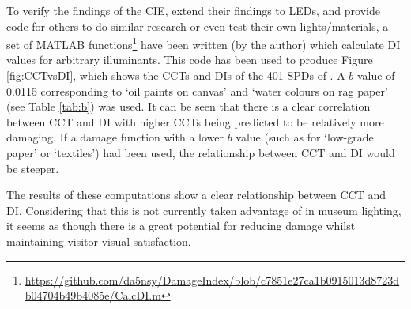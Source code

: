 To verify the findings of the \gls{CIE}, extend their findings to \glspl{LED}, and provide code for others to do similar research or even test their own lights/materials, a set of MATLAB functions\footnote{\url{https://github.com/da5nsy/DamageIndex/blob/c7851e27ca1b0915013d8723db04704b49b4085e/CalcDI.m}} have been written (by the author) which calculate \gls{DI} values for arbitrary illuminants. This code has been used to produce Figure \ref{fig:CCTvsDI}, which shows the \glspl{CCT} and \glspl{DI} of the 401 \glspl{SPD} of \citet{houser_review_2013}. A $b$ value of 0.0115 corresponding to `oil paints on canvas' and `water colours on rag paper' (see Table \ref{tab:b}) was used. It can be seen that there is a clear correlation between \gls{CCT} and \gls{DI} with higher \glspl{CCT} being predicted to be relatively more damaging. If a damage function with a lower $b$ value (such as for `low-grade paper' or `textiles') had been used, the relationship between \gls{CCT} and \gls{DI} would be steeper.

%

\begin{fullpagefigure}
\figpageside{}
\caption{The \glspl{CCT} and \glspl{DI} of the \glspl{SPD} used by \citet{houser_review_2013} [provided via personal communication, but now partially (without category information) available via \gls{PTB} as `spd\_houser'].}
\label{fig:CCTvsDI}
\end{fullpagefigure}

The results of these computations show a clear relationship between \gls{CCT} and \gls{DI}. Considering that this is not currently taken advantage of in museum lighting, it seems as though there is a great potential for reducing damage whilst maintaining visitor visual satisfaction.



\cleardoublepage %

